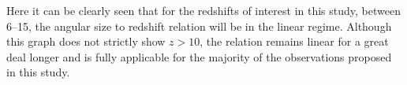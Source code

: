 	Here it can be clearly seen that for the redshifts of interest in this study, between 6--15, the angular size to redshift relation will be in the linear regime. Although this graph does not strictly show $z > 10$, the relation remains linear for a great deal longer and is fully applicable for the majority of the observations proposed in this study.
